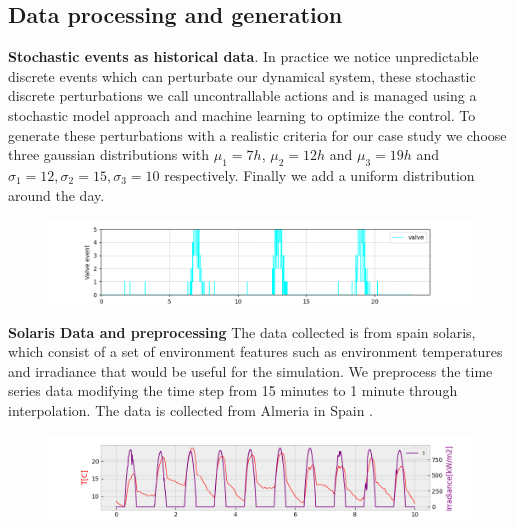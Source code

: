     \subsection{Data processing and generation}      
      \textbf{Stochastic events as historical data}. In practice
      we notice unpredictable discrete events which can perturbate our dynamical
      system, these stochastic discrete perturbations we call uncontrallable actions and 
      is managed using a stochastic model approach and machine learning to optimize
      the control. To generate these perturbations with a realistic criteria for 
      our case study we choose three gaussian distributions with 
      $\mu_1 = 7h$, $\mu_2 = 12h$ and $\mu_3 = 19h$
      and $\sigma_1=12,\sigma_2=15, \sigma_3=10$ respectively. Finally we add 
      a uniform distribution around the day.
      \begin{figure}[!hbt]      
        \centering
        \includegraphics[width=1.2\linewidth]{images/uncontrollable}      
        \captionsetup{format=hang}
        \label{fig:uncontrollable}
      \end{figure}

      \textbf{Solaris Data and preprocessing} The data collected is from 
      spain solaris, which consist of a set of environment features such as
      environment temperatures and irradiance that would be useful for the 
      simulation. We preprocess the time series data modifying 
      the time step from 15 minutes to 1 minute through interpolation.
      The data is collected from Almeria in Spain \cite{solargis}.

      \begin{figure}[!hbt]
        \centering
        \includegraphics[width=1.2\linewidth]{images/solaris2}
        \captionsetup{format=hang}
      \end{figure}
      \clearpage
      
